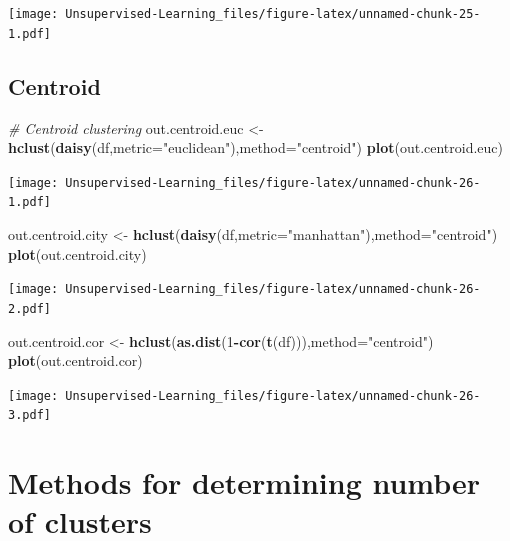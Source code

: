 \documentclass[
]{book}
\newenvironment{Shaded}{\begin{snugshade}}{\end{snugshade}}
\newcommand{\CommentTok}[1]{\textcolor[rgb]{0.56,0.35,0.01}{\textit{#1}}}
\newcommand{\DataTypeTok}[1]{\textcolor[rgb]{0.13,0.29,0.53}{#1}}
\newcommand{\DecValTok}[1]{\textcolor[rgb]{0.00,0.00,0.81}{#1}}
\newcommand{\KeywordTok}[1]{\textcolor[rgb]{0.13,0.29,0.53}{\textbf{#1}}}
\newcommand{\NormalTok}[1]{#1}
\newcommand{\OperatorTok}[1]{\textcolor[rgb]{0.81,0.36,0.00}{\textbf{#1}}}
\newcommand{\StringTok}[1]{\textcolor[rgb]{0.31,0.60,0.02}{#1}}
\begin{document}
\texttt{[image: Unsupervised-Learning\_files/figure-latex/unnamed-chunk-25-1.pdf]}

\hypertarget{centroid}{%
\subsection{Centroid}\label{centroid}}

\begin{Shaded}
\begin{Highlighting}[]
\CommentTok{# Centroid clustering}
\NormalTok{out.centroid.euc <-}\StringTok{ }\KeywordTok{hclust}\NormalTok{(}\KeywordTok{daisy}\NormalTok{(df,}\DataTypeTok{metric=}\StringTok{"euclidean"}\NormalTok{),}\DataTypeTok{method=}\StringTok{"centroid"}\NormalTok{)}
\KeywordTok{plot}\NormalTok{(out.centroid.euc)}
\end{Highlighting}
\end{Shaded}

\texttt{[image: Unsupervised-Learning\_files/figure-latex/unnamed-chunk-26-1.pdf]}

\begin{Shaded}
\begin{Highlighting}[]
\NormalTok{out.centroid.city <-}\StringTok{ }\KeywordTok{hclust}\NormalTok{(}\KeywordTok{daisy}\NormalTok{(df,}\DataTypeTok{metric=}\StringTok{"manhattan"}\NormalTok{),}\DataTypeTok{method=}\StringTok{"centroid"}\NormalTok{)}
\KeywordTok{plot}\NormalTok{(out.centroid.city)}
\end{Highlighting}
\end{Shaded}

\texttt{[image: Unsupervised-Learning\_files/figure-latex/unnamed-chunk-26-2.pdf]}

\begin{Shaded}
\begin{Highlighting}[]
\NormalTok{out.centroid.cor <-}\StringTok{ }\KeywordTok{hclust}\NormalTok{(}\KeywordTok{as.dist}\NormalTok{(}\DecValTok{1}\OperatorTok{-}\KeywordTok{cor}\NormalTok{(}\KeywordTok{t}\NormalTok{(df))),}\DataTypeTok{method=}\StringTok{"centroid"}\NormalTok{)}
\KeywordTok{plot}\NormalTok{(out.centroid.cor)}
\end{Highlighting}
\end{Shaded}

\texttt{[image: Unsupervised-Learning\_files/figure-latex/unnamed-chunk-26-3.pdf]}

\hypertarget{methods-for-determining-number-of-clusters}{%
\section{Methods for determining number of clusters}\label{methods-for-determining-number-of-clusters}}
\end{document}
